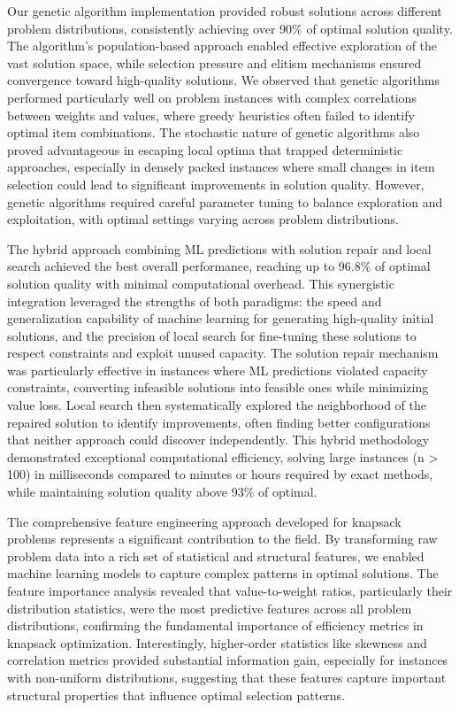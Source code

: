 \documentclass[conference, a4paper]{IEEEtran}
\begin{document}
Our genetic algorithm implementation provided robust solutions across different problem distributions, consistently achieving over 90\% of optimal solution quality. The algorithm's population-based approach enabled effective exploration of the vast solution space, while selection pressure and elitism mechanisms ensured convergence toward high-quality solutions. We observed that genetic algorithms performed particularly well on problem instances with complex correlations between weights and values, where greedy heuristics often failed to identify optimal item combinations. The stochastic nature of genetic algorithms also proved advantageous in escaping local optima that trapped deterministic approaches, especially in densely packed instances where small changes in item selection could lead to significant improvements in solution quality. However, genetic algorithms required careful parameter tuning to balance exploration and exploitation, with optimal settings varying across problem distributions.

The hybrid approach combining ML predictions with solution repair and local search achieved the best overall performance, reaching up to 96.8\% of optimal solution quality with minimal computational overhead. This synergistic integration leveraged the strengths of both paradigms: the speed and generalization capability of machine learning for generating high-quality initial solutions, and the precision of local search for fine-tuning these solutions to respect constraints and exploit unused capacity. The solution repair mechanism was particularly effective in instances where ML predictions violated capacity constraints, converting infeasible solutions into feasible ones while minimizing value loss. Local search then systematically explored the neighborhood of the repaired solution to identify improvements, often finding better configurations that neither approach could discover independently. This hybrid methodology demonstrated exceptional computational efficiency, solving large instances (n > 100) in milliseconds compared to minutes or hours required by exact methods, while maintaining solution quality above 93\% of optimal.

The comprehensive feature engineering approach developed for knapsack problems represents a significant contribution to the field. By transforming raw problem data into a rich set of statistical and structural features, we enabled machine learning models to capture complex patterns in optimal solutions. The feature importance analysis revealed that value-to-weight ratios, particularly their distribution statistics, were the most predictive features across all problem distributions, confirming the fundamental importance of efficiency metrics in knapsack optimization. Interestingly, higher-order statistics like skewness and correlation metrics provided substantial information gain, especially for instances with non-uniform distributions, suggesting that these features capture important structural properties that influence optimal selection patterns.
\end{document}
